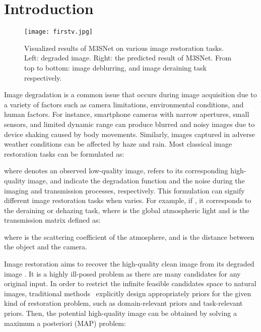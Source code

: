 \documentclass[sn-mathphys,Numbered]{sn-jnl}
\theoremstyle{thmstyleone}\newtheorem{theorem}{Theorem}\newtheorem{proposition}[theorem]{Proposition}
\theoremstyle{thmstyletwo}\newtheorem{example}{Example}\newtheorem{remark}{Remark}
\theoremstyle{thmstylethree}\newtheorem{definition}{Definition}
\begin{document}
\maketitle

\section{Introduction}\label{sec1}
\begin{figure}[b] \centering
	\texttt{[image: firstv.jpg]}
	\caption{Visualized results of M3SNet on various image
restoration tasks. Left: degraded image. Right: the predicted result of M3SNet. From top to bottom: image deblurring, and image deraining task respectively.}
	\label{fig:001}
\end{figure}
Image degradation is a common issue that occurs during image acquisition due to a variety of factors such as camera limitations, environmental conditions, and human factors. For instance, smartphone cameras with narrow apertures, small sensors, and limited dynamic range can produce blurred and noisy images due to device shaking caused by body movements. Similarly, images captured in adverse weather conditions can be affected by haze and rain.  Most classical image restoration tasks can be formulated as:

where  denotes an observed low-quality image,  refers to its corresponding high-quality image, and indicate the degradation function and the noise during the imaging and transmission processes, respectively. This formulation can signify different image restoration tasks when  varies. For example, if , it corresponds to the deraining or dehazing task, where  is the global atmospheric light and  is the transmission matrix defined as:

where  is the scattering coefficient of the atmosphere, and  is the distance between the object and the camera.

Image restoration  aims to recover the high-quality clean image  from its degraded image . It is a highly ill-posed problem as there are many candidates for any original input. In order to restrict the infinite feasible candidates space to natural images, traditional methods~\cite{1992Nonlinear, 1997Prior, 2002Scale, 2005Fields, 2010Single, 2011Image, 2011Single} explicitly design appropriately priors for the given kind of restoration problem, such as domain-relevant priors and task-relevant priors. Then, the potential high-quality image can be obtained by solving a maximum a posteriori (MAP) problem:
\end{document}
